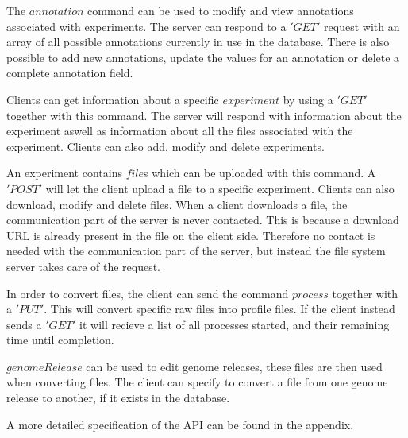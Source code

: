 The $annotation$ command can be used to modify and view annotations associated with experiments. The server can respond to a $'GET'$ request with an array of all possible annotations currently in use in the database. There is also possible to add new annotations, update the values for an annotation or delete a complete annotation field. 

Clients can get information about a specific $experiment$ by using a $'GET'$ together with this command. The server will respond with information about the experiment aswell as information about all the files associated with the experiment. Clients can also add, modify and delete experiments. 

An experiment contains $file$s which can be uploaded with this command. A $'POST'$ will let the client upload a file to a specific experiment. Clients can also download, modify and delete files. When a client downloads a file, the communication part of the server is never contacted. This is because a download URL is already present in the file on the client side. Therefore no contact is needed with the communication part of the server, but instead the file system server takes care of the request. 

In order to convert files, the client can send the command $process$ together with a $'PUT'$. This will convert specific raw files into profile files. If the client instead sends a $'GET'$ it will recieve a list of all processes started, and their remaining time until completion. 

$genomeRelease$ can be used to edit genome releases, these files are then used when converting files. The client can specify to convert a file from one genome release to another, if it exists in the database. 

A more detailed specification of the API can be found in the appendix. 
